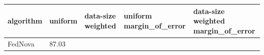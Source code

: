 \begin{tabular}{lllll}
\toprule
algorithm & uniform & data-size weighted & uniform margin_of_error & data-size weighted margin_of_error \\
\midrule
FedNova & 87.03%
\bottomrule
\end{tabular}
